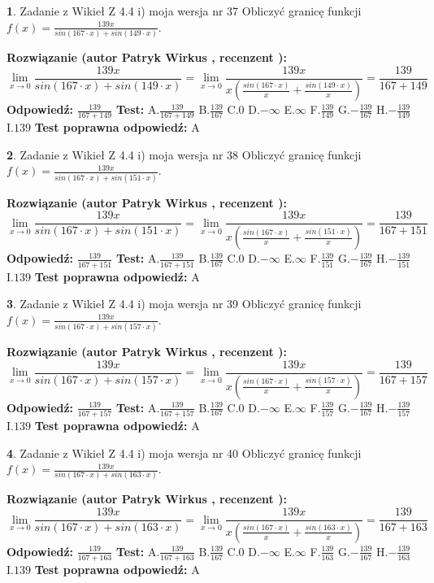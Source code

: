 \documentclass[12pt, a4paper]{article}
\theoremstyle{definition} %
\newtheorem{zad}{}
\newcommand{\zadStart}[1]{\begin{zad}#1\newline}
\newcommand{\zadStop}{\end{zad}}
\newcommand{\rozwStart}[2]{\noindent \textbf{Rozwiązanie (autor #1 , recenzent #2): }\newline}
\newcommand{\rozwStop}{\newline}
\newcommand{\odpStart}{\noindent \textbf{Odpowiedź:}\newline}
\newcommand{\odpStop}{\newline}
\newcommand{\testStart}{\noindent \textbf{Test:}\newline}
\newcommand{\testStop}{\newline}
\newcommand{\kluczStart}{\noindent \textbf{Test poprawna odpowiedź:}\newline}
\newcommand{\kluczStop}{\newline}
\begin{document}
\zadStart{Zadanie z Wikieł Z 4.4 i) moja wersja nr 37}
Obliczyć granicę funkcji $f(x)=\frac{139x}{sin(167\cdot x) +sin(149\cdot x)}$.
\zadStop
\rozwStart{Patryk Wirkus}{}
$$\lim\limits_{x\to 0}\frac{139x}{sin(167\cdot x) +sin(149\cdot x)}=\lim\limits_{x\to 0}\frac{139x}{x(\frac{sin(167\cdot x)}{x}+\frac{sin(149\cdot x)}{x})}=\frac{139}{167+149}$$
\rozwStop
\odpStart
$\frac{139}{167+149}$
\odpStop
\testStart
A.$\frac{139}{167+149}$
B.$\frac{139}{167}$
C.$0$
D.$-\infty$
E.$\infty$
F.$\frac{139}{149}$
G.$-\frac{139}{167}$
H.$-\frac{139}{149}$
I.$139$
\testStop
\kluczStart
A
\kluczStop



\zadStart{Zadanie z Wikieł Z 4.4 i) moja wersja nr 38}
Obliczyć granicę funkcji $f(x)=\frac{139x}{sin(167\cdot x) +sin(151\cdot x)}$.
\zadStop
\rozwStart{Patryk Wirkus}{}
$$\lim\limits_{x\to 0}\frac{139x}{sin(167\cdot x) +sin(151\cdot x)}=\lim\limits_{x\to 0}\frac{139x}{x(\frac{sin(167\cdot x)}{x}+\frac{sin(151\cdot x)}{x})}=\frac{139}{167+151}$$
\rozwStop
\odpStart
$\frac{139}{167+151}$
\odpStop
\testStart
A.$\frac{139}{167+151}$
B.$\frac{139}{167}$
C.$0$
D.$-\infty$
E.$\infty$
F.$\frac{139}{151}$
G.$-\frac{139}{167}$
H.$-\frac{139}{151}$
I.$139$
\testStop
\kluczStart
A
\kluczStop



\zadStart{Zadanie z Wikieł Z 4.4 i) moja wersja nr 39}
Obliczyć granicę funkcji $f(x)=\frac{139x}{sin(167\cdot x) +sin(157\cdot x)}$.
\zadStop
\rozwStart{Patryk Wirkus}{}
$$\lim\limits_{x\to 0}\frac{139x}{sin(167\cdot x) +sin(157\cdot x)}=\lim\limits_{x\to 0}\frac{139x}{x(\frac{sin(167\cdot x)}{x}+\frac{sin(157\cdot x)}{x})}=\frac{139}{167+157}$$
\rozwStop
\odpStart
$\frac{139}{167+157}$
\odpStop
\testStart
A.$\frac{139}{167+157}$
B.$\frac{139}{167}$
C.$0$
D.$-\infty$
E.$\infty$
F.$\frac{139}{157}$
G.$-\frac{139}{167}$
H.$-\frac{139}{157}$
I.$139$
\testStop
\kluczStart
A
\kluczStop



\zadStart{Zadanie z Wikieł Z 4.4 i) moja wersja nr 40}
Obliczyć granicę funkcji $f(x)=\frac{139x}{sin(167\cdot x) +sin(163\cdot x)}$.
\zadStop
\rozwStart{Patryk Wirkus}{}
$$\lim\limits_{x\to 0}\frac{139x}{sin(167\cdot x) +sin(163\cdot x)}=\lim\limits_{x\to 0}\frac{139x}{x(\frac{sin(167\cdot x)}{x}+\frac{sin(163\cdot x)}{x})}=\frac{139}{167+163}$$
\rozwStop
\odpStart
$\frac{139}{167+163}$
\odpStop
\testStart
A.$\frac{139}{167+163}$
B.$\frac{139}{167}$
C.$0$
D.$-\infty$
E.$\infty$
F.$\frac{139}{163}$
G.$-\frac{139}{167}$
H.$-\frac{139}{163}$
I.$139$
\testStop
\kluczStart
A
\kluczStop
\end{document}
